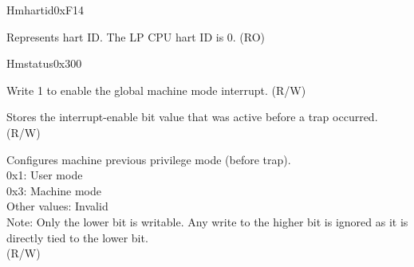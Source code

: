 \begin{register}{H}{mhartid}{0xF14}\label{regdesc:LPMHARTID}
%
\regnewline%
\begin{regdesc}\begin{reglist}
\label{fielddesc:LPMHARTID}\item [MHARTID] Represents hart ID. The LP CPU hart ID is 0. (RO)
\end{reglist}\end{regdesc}
\end{register}

\begin{register}{H}{mstatus}{0x300}\label{regdesc:LPMSTATUS}
%
%
%
%
%
%
%
\regnewline%
\begin{regdesc}\begin{reglist}
\label{fielddesc:LPMSTATUSMIE}\item [MIE] Write 1 to enable the global machine mode interrupt. (R/W)
\label{fielddesc:LPMSTATUSMPIE}\item [MPIE] Stores the interrupt-enable bit value that was active before a trap occurred. (R/W)
\label{fielddesc:LPMSTATUSMPP}\item [MPP] Configures machine previous privilege mode (before trap).\\
0x1: User mode\\
0x3: Machine mode\\
Other values: Invalid\\
Note: Only the lower bit is writable. Any write to the higher bit is ignored as it is directly tied to the lower bit.\\
(R/W)
\end{reglist}\end{regdesc}
\end{register}

